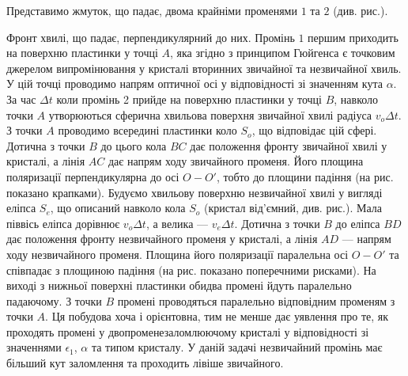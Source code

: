 \begin{solutionexample}

Представимо жмуток, що падає, двома крайніми променями $ 1 $ та $ 2 $ (див. рис.).

\begin{center}
    
\end{center}
Фронт хвилі, що падає, перпендикулярний до них. Промінь $ 1 $ першим приходить на поверхню пластинки у точці $ A $, яка згідно з принципом Гюйгенса є точковим джерелом випромінювання у кристалі вторинних звичайної та незвичайної хвиль. У цій точці проводимо напрям оптичної осі у відповідності зі значенням кута $ \alpha $. За час $ \Delta t $ коли промінь 2 прийде на поверхню пластинки у точці $ B $, навколо точки $ A $ утворюються сферична хвильова поверхня звичайної хвилі радіуса $ v_o\Delta t $. З точки $ A $ проводимо всередині пластинки коло $ S_o $, що відповідає цій сфері. Дотична з точки $ B $ до цього кола $ BC $ дає положення фронту звичайної хвилі у кристалі, а лінія $ AC $ дає напрям ходу звичайного променя. Його площина поляризації перпендикулярна до осі $ O - O' $, тобто до площини падіння (на рис. показано крапками). Будуємо хвильову поверхню незвичайної хвилі у вигляді еліпса $ S_e $, що описаний навколо кола $ S_o $ (кристал від’ємний, див. рис.). Мала піввісь еліпса дорівнює $ v_o\Delta t $, а велика --- $ v_e\Delta t $. Дотична з точки $ B $ до еліпса $ BD $ дає положення фронту незвичайного променя у кристалі, а лінія $ AD $ --- напрям ходу незвичайного променя. Площина його поляризації паралельна осі $ O - O' $ та співпадає з площиною падіння (на рис. показано поперечними рисками). На виході з нижньої поверхні пластинки обидва промені йдуть паралельно падаючому. З точки $ B $ промені проводяться паралельно відповідним променям з точки $ A $. Ця побудова хоча і орієнтовна, тим не менше дає уявлення про те, як проходять промені у двопроменезаломлюючому кристалі у відповідності зі значеннями $ \epsilon_1 $, $ \alpha $ та типом кристалу. У даній задачі незвичайний промінь має більший кут заломлення та проходить лівіше звичайного.
\end{solutionexample}


